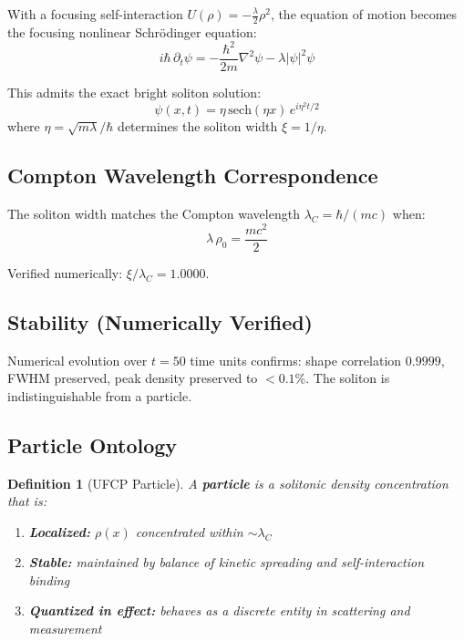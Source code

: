 \documentclass[11pt, a4paper]{article}
\newtheorem{definition}{Definition}[section]
\begin{document}
With a focusing self-interaction
$U(\rho) = -\frac{\lambda}{2}\rho^2$, the equation of motion
becomes the focusing nonlinear Schr\"odinger equation:
\begin{equation}
  i\hbar\,\partial_t\psi =
  -\frac{\hbar^2}{2m}\nabla^2\psi - \lambda|\psi|^2\psi
\end{equation}

This admits the exact bright soliton solution:
\begin{equation}
  \psi(x,t) = \eta\,\mathrm{sech}(\eta x)\, e^{i\eta^2 t/2}
\end{equation}
where $\eta = \sqrt{m\lambda}/\hbar$ determines the soliton width
$\xi = 1/\eta$.

\subsection{Compton Wavelength Correspondence}

The soliton width matches the Compton wavelength
$\lambda_C = \hbar/(mc)$ when:
\begin{equation}
  \lambda\,\rho_0 = \frac{mc^2}{2}
\end{equation}

Verified numerically: $\xi/\lambda_C = 1.0000$.

\subsection{Stability (Numerically Verified)}

Numerical evolution over $t = 50$ time units confirms:
shape correlation $0.9999$, FWHM preserved, peak density preserved
to $< 0.1\%$. The soliton is indistinguishable from a particle.

\subsection{Particle Ontology}

\begin{definition}[UFCP Particle]
A \textbf{particle} is a solitonic density concentration that is:
\begin{enumerate}[nosep]
  \item \textbf{Localized:} $\rho(x)$ concentrated within
        $\sim\lambda_C$
  \item \textbf{Stable:} maintained by balance of kinetic spreading
        and self-interaction binding
  \item \textbf{Quantized in effect:} behaves as a discrete entity
        in scattering and measurement
\end{enumerate}
\end{definition}
\end{document}
